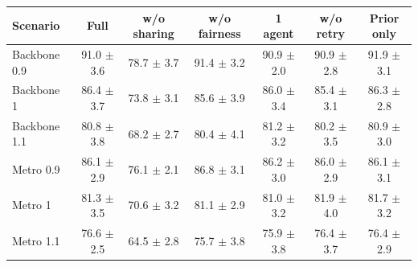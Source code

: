 \begin{tabular}{lcccccc}
\toprule
Scenario & Full & w/o sharing & w/o fairness & 1 agent & w/o retry & Prior only \\
\midrule
Backbone 0.9 & 91.0 $\pm$ 3.6 & 78.7 $\pm$ 3.7 & 91.4 $\pm$ 3.2 & 90.9 $\pm$ 2.0 & 90.9 $\pm$ 2.8 & 91.9 $\pm$ 3.1 \\
Backbone 1 & 86.4 $\pm$ 3.7 & 73.8 $\pm$ 3.1 & 85.6 $\pm$ 3.9 & 86.0 $\pm$ 3.4 & 85.4 $\pm$ 3.1 & 86.3 $\pm$ 2.8 \\
Backbone 1.1 & 80.8 $\pm$ 3.8 & 68.2 $\pm$ 2.7 & 80.4 $\pm$ 4.1 & 81.2 $\pm$ 3.2 & 80.2 $\pm$ 3.5 & 80.9 $\pm$ 3.0 \\
Metro 0.9 & 86.1 $\pm$ 2.9 & 76.1 $\pm$ 2.1 & 86.8 $\pm$ 3.1 & 86.2 $\pm$ 3.0 & 86.0 $\pm$ 2.9 & 86.1 $\pm$ 3.1 \\
Metro 1 & 81.3 $\pm$ 3.5 & 70.6 $\pm$ 3.2 & 81.1 $\pm$ 2.9 & 81.0 $\pm$ 3.2 & 81.9 $\pm$ 4.0 & 81.7 $\pm$ 3.2 \\
Metro 1.1 & 76.6 $\pm$ 2.5 & 64.5 $\pm$ 2.8 & 75.7 $\pm$ 3.8 & 75.9 $\pm$ 3.8 & 76.4 $\pm$ 3.7 & 76.4 $\pm$ 2.9 \\
\bottomrule
\end{tabular}
